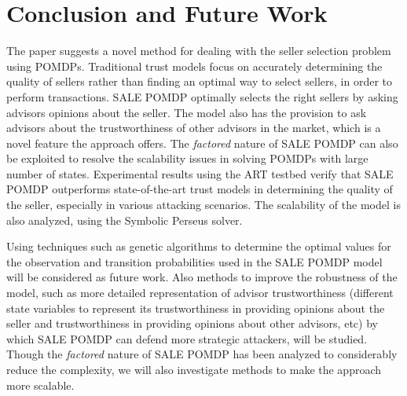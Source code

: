 \documentclass{aamas2014}
\providecommand{\SALEP}{SALE POMDP}
\begin{document}
\section{Conclusion and Future Work}\label{sec:6}
The paper suggests a novel method for dealing with the seller selection problem using POMDPs. Traditional trust models focus on accurately determining the quality of sellers rather than finding an optimal way to select sellers, in order to perform transactions. \SALEP{} optimally selects the right sellers by asking advisors opinions about the seller. The model also has the provision to ask advisors about the trustworthiness of other advisors in the market, which is a novel feature the approach offers. The \textit{factored} nature of \SALEP{} can also be exploited to resolve the scalability issues in solving POMDPs with large number of states. Experimental results using the ART testbed verify that \SALEP{} outperforms state-of-the-art trust models in determining the quality of the seller, especially in various attacking scenarios. The scalability of the model is also analyzed, using the Symbolic Perseus solver.

Using techniques such as genetic algorithms to determine the optimal values for the observation and transition probabilities used in the \SALEP{} model will be considered as future work. Also methods to improve the robustness of the model, such as more detailed representation of advisor trustworthiness (different state variables to represent its trustworthiness in providing opinions about the seller and trustworthiness in providing opinions about other advisors, etc) by which \SALEP{} can defend more strategic attackers, will be studied. Though the \textit{factored} nature of \SALEP{} has been analyzed to considerably reduce the complexity, we will also investigate methods to make the approach more scalable.



\end{document}
